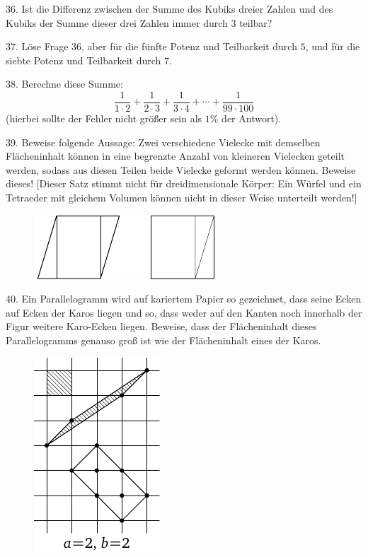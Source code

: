 \begin{problem}{36.}
	Ist die Differenz zwischen der Summe des Kubiks dreier Zahlen und des Kubiks der Summe dieser drei Zahlen immer durch $3$ teilbar? 
\end{problem}

\begin{problem}{37.}
	Löse Frage 36, aber für die fünfte Potenz und Teilbarkeit durch $5$, und für die siebte Potenz und Teilbarkeit durch $7$. 
\end{problem}

\begin{problem}{38.}
	Berechne diese Summe:
	\begin{equation*}
		\frac{1}{1\cdot 2} + \frac{1}{2\cdot 3} + \frac{1}{3\cdot 4} + \dotsb + \frac{1}{99\cdot 100}
	\end{equation*}
	(hierbei sollte der Fehler nicht größer sein als $1\%$ der Antwort).
\end{problem}

\begin{problem}{39.}
	Beweise folgende Aussage: Zwei verschiedene Vielecke mit demselben Flächeninhalt können in eine begrenzte Anzahl von kleineren Vielecken geteilt werden, sodass aus diesen Teilen beide Vielecke geformt werden können. Beweise dieses! [Dieser Satz stimmt nicht für dreidimensionale Körper: Ein Würfel und ein Tetraeder mit gleichem Volumen können nicht in dieser Weise unterteilt werden!]
	\begin{figure}
		\includegraphics{q39_horizontal}
	\end{figure}
\end{problem}

\begin{problem}{40.}
	Ein Parallelogramm wird auf kariertem Papier so gezeichnet, dass seine Ecken auf Ecken der Karos liegen und so, dass weder auf den Kanten noch innerhalb der Figur weitere Karo-Ecken liegen. Beweise, dass der Flächeninhalt dieses Parallelogramms genauso groß ist wie der Flächeninhalt eines der Karos. 
	\begin{figure}
		\includegraphics{taskbook-24}
	\end{figure}
\end{problem}

